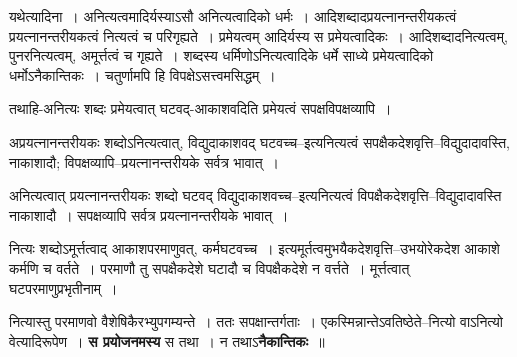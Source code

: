 \documentclass[article,12pt,a4paper]{memoir}
\begin{document}
	यथेत्यादिना । अनित्यत्वमादिर्यस्याऽसौ अनित्यत्वादिको धर्मः । आदिशब्दादप्रयत्नानन्तरीयकत्वं प्रयत्नानन्तरीयकत्वं नित्यत्वं च परिगृह्यते । प्रमेयत्वम् आदिर्यस्य स प्रमेयत्वादिकः । आदिशब्दादनित्यत्वम्, पुनरनित्यत्वम्, अमूर्त्तत्वं च गृह्यते । शब्दस्य धर्मिणोऽनित्यत्वादिके धर्मे साध्ये प्रमेयत्वादिको धर्मोऽनैकान्तिकः । चतुर्णामपि हि विपक्षेऽसत्त्वमसिद्धम् ।  
	  
	तथाहि-अनित्यः शब्दः प्रमेयत्वात् घटवद्-आकाशवदिति प्रमेयत्वं सपक्षविपक्षव्यापि ।  
	  
	अप्रयत्नानन्तरीयकः शब्दोऽनित्यत्वात्, विद्युदाकाशवद् घटवच्च--इत्यनित्यत्वं सपक्षैकदेशवृत्ति--विद्युदादावस्ति, नाकाशादौ; विपक्षव्यापि--प्रयत्नानन्तरीयके सर्वत्र भावात् ।  
	  
	अनित्यत्वात् प्रयत्नानन्तरीयकः शब्दो घटवद् विद्युदाकाशवच्च--इत्यनित्यत्वं विपक्षैकदेशवृत्ति--विद्युदादावस्ति नाकाशादौ । सपक्षव्यापि सर्वत्र प्रयत्नानन्तरीयके भावात् ।  
	  
	नित्यः शब्दोऽमूर्त्तत्वाद् आकाशपरमाणुवत्, कर्मघटवच्च । इत्यमूर्तत्वमुभयैकदेशवृत्ति--उभयोरेकदेश आकाशे कर्मणि च वर्तते । परमाणौ तु सपक्षैकदेशे घटादौ च विपक्षैकदेशे न वर्त्तते । मूर्त्तत्वात् घटपरमाणुप्रभृतीनाम् ।  
	  
	नित्यास्तु परमाणवो वैशेषिकैरभ्युपगम्यन्ते । ततः सपक्षान्तर्गताः । एकस्मिन्नान्तेऽवतिष्ठेते--नित्यो वाऽनित्यो वेत्यादिरूपेण । \textbf{स प्रयोजनमस्य} स तथा । न तथाऽ\textbf{नैकान्तिकः} ॥
	\pend
      
\end{document}
